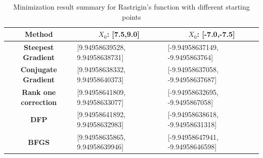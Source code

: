 \documentclass{article}
\begin{document}
\clearpage

\begin{table}[h]
\centering
\caption{Minimization result summary for Rastrigin's function with different starting points }
\label{my-label}
\begin{tabular}{|c|l|l|}
\hline
\textbf{Method}              & \multicolumn{1}{c|}{\textbf{$X_0$: {[}7.5,9.0{]}}} & \multicolumn{1}{c|}{\textbf{$X_0$: {[}-7.0,-7.5{]}}} \\ \hline
\textbf{Steepest Gradient}   & {[}9.94958639528, 9.94958638731{]}                & {[}-9.94958637149, -9.9495863764{]}                 \\ \hline
\textbf{Conjugate Gradient}  & {[}9.94958638332, 9.94958640373{]}                & {[}-9.94958637058, -9.94958637687{]}                \\ \hline
\textbf{Rank one correction} & {[}9.94958641809, 9.94958633077{]}                & {[}-9.94958632695, -9.9495867058{]}                 \\ \hline
\textbf{DFP}                 & {[}9.94958641892, 9.94958632983{]}                & {[}-9.94958638618, -9.94958631318{]}                \\ \hline
\textbf{BFGS}                & {[}9.94958635865, 9.94958639946{]}                & {[}-9.94958647941, -9.94958646598{]}                \\ \hline
\end{tabular}
\end{table}
\end{document}
